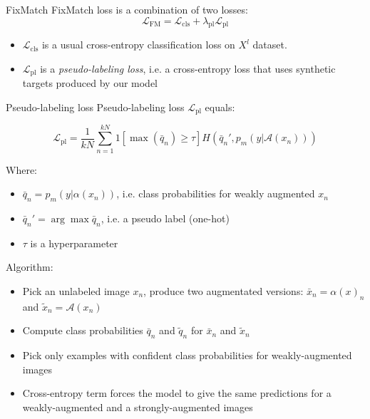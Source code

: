 \documentclass[10pt]{beamer}
\begin{document}
\begin{frame}{FixMatch}
    \pause
    FixMatch loss is a combination of two losses:
    \begin{equation}
        \mathcal{L}_\text{FM} = \mathcal{L}_\text{cls} + \lambda_\text{pl}\mathcal{L}_\text{pl}
    \end{equation}
    \begin{itemize}
        \item\pause $\mathcal{L}_\text{cls}$ is a usual cross-entropy classification loss on $X^l$ dataset.
        \item\pause $\mathcal{L}_\text{pl}$ is a \textit{pseudo-labeling loss}, i.e. a cross-entropy loss that uses synthetic targets produced by our model
    \end{itemize}
\end{frame}

\begin{frame}{Pseudo-labeling loss}
\pause
Pseudo-labeling loss $\mathcal{L}_\text{pl}$ equals:

\begin{equation}
\mathcal{L}_\text{pl} = \frac{1}{kN} \sum_{n=1}^{kN} 1\left[\max \left(\bar{q}_n\right) \geq \tau\right] H\left(\bar{q}_{n}', p_m\left(y | \mathcal{A}\left(x_{n}\right)\right)\right)
\end{equation}

Where:
\begin{itemize}
    \item $\bar{q}_n = p_m(y | \alpha(x_n))$, i.e. class probabilities for weakly augmented $x_n$
    \item $\bar{q}_n' = \arg\max \bar{q}_n$, i.e. a pseudo label (one-hot)
    \item $\tau$ is a hyperparameter
\end{itemize}

\pause
Algorithm:
\begin{itemize}
    \item\pause Pick an unlabeled image $x_n$, produce two augmentated versions: $\bar{x}_n = \alpha(x)_n$ and $\tilde{x}_n = \mathcal{A}(x_n)$
    \item\pause Compute class probabilities $\bar{q}_n$ and $\tilde{q}_n$ for $\bar{x}_n$ and $\tilde{x}_n$
    \item\pause Pick only examples with confident class probabilities for weakly-augmented images
    \item\pause Cross-entropy term forces the model to give the same predictions for a weakly-augmented and a strongly-augmented images
\end{itemize}
\end{frame}
\end{document}
